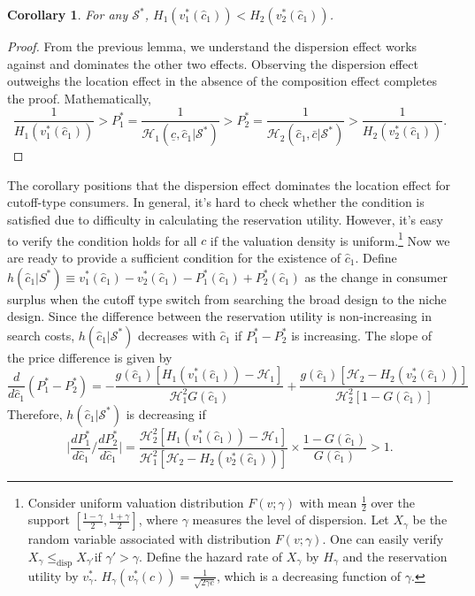 \documentclass[14pt]{article}
\theoremstyle{plain}
\newtheorem{cor}[thm]{Corollary}
\theoremstyle{definition}
\theoremstyle{remark}
\DeclareRobustCommand\1{\futurelet\oneNext\oneCheck}
\renewcommand{\S}{\mathcal{S}}
\renewcommand{\H}{\mathcal{H}}
\begin{document}
\begin{cor}
For any $\S^*$, $H_1(v_1^*(\hat{c}_1))<H_2(v_2^*(\hat{c}_1))$.
\end{cor}
\begin{proof}
From the previous lemma, we understand the dispersion effect works against and dominates the other two effects. Observing the dispersion effect outweighs the location effect in the absence of the composition effect completes the proof. Mathematically, \[\frac{1}{H_1(v_1^*(\hat{c}_1))}>P_1^*=\frac{1}{\H_1(\underline{c},\hat{c}_1|\S^*)}>P_2^* = \frac{1}{\H_2(\hat{c}_1, \bar{c}|\S^*)}>\frac{1}{H_2(v_2^*(\hat{c}_1))}.\]
\end{proof}
The corollary positions that the dispersion effect dominates the location effect for cutoff-type consumers. In general, it's hard to check whether the condition is satisfied due to difficulty in calculating the reservation utility. However, it's easy to verify the condition holds for all $c$ if the valuation density is uniform.\footnote{Consider uniform valuation distribution $F(v;\gamma)$ with mean $\frac{1}{2}$ over the support $[\frac{1-\gamma}{2}, \frac{1+\gamma}{2}]$, where $\gamma$ measures the level of dispersion. Let $X_{\gamma}$ be the random variable associated with distribution $F(v;\gamma)$. One can easily verify $X_{\gamma}\leq_{\text{disp}}X_{\gamma'}$if $\gamma'>\gamma$. Define the hazard rate of $X_{\gamma}$ by $H_\gamma$ and the reservation utility by $v_{\gamma}^*$. $H_\gamma(v_{\gamma}^*(c))=\frac{1}{\sqrt{2\gamma c }}$, which is a decreasing function of $\gamma$. }
Now we are ready to provide a sufficient condition for the existence of $\hat{c}_1$. Define $h(\hat{c}_1|S^*)\equiv v_1^*(\hat{c}_1)-v_2^*(\hat{c}_1)-P_1^*(\hat{c}_1)+P_2^*(\hat{c}_1)$ as the change in consumer surplus when the cutoff type switch from searching the broad design to the niche design. Since the difference between the reservation utility is non-increasing in search costs, $h(\hat{c}_1|\S^*)$ decreases with $\hat{c}_1$ if $P_1^*-P_2^*$ is increasing. 
The slope of the price difference is given by
\[
\frac{d}{d \hat{c}_1}(P_1^*-P_2^*) = -\frac{g(\hat{c}_1)[H_1(v_1^*(\hat{c}_1))-\H_1]}{\H_1^2G(\hat{c}_1)}+\frac{g(\hat{c}_1)[\H_2-H_2(v_2^*(\hat{c}_1))]}{\H_2^2[1-G(\hat{c}_1)]}
\]
Therefore, $h(\hat{c}_1|\S^*)$ is decreasing if 
\[
 \lvert\frac{d P_1^*}{d \hat{c}_1}\big/\frac{d P_2^*}{d \hat{c}_1}\rvert=\frac{\H_2^2[H_1(v_1^*(\hat{c}_1))-\H_1]}{\H_1^2 [\H_2-H_2(v_2^*(\hat{c}_1))]}\times \frac{1-G(\hat{c}_1)}{G(\hat{c}_1)}>1.
\]
\end{document}

